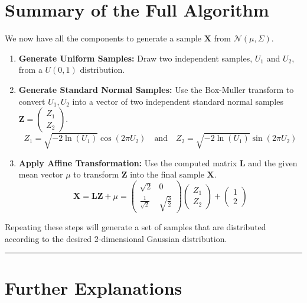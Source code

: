 \documentclass[11pt,a4paper]{article}
\newcommand{\N}{\mathcal{N}}
\newcommand{\mat}[1]{\mathbf{#1}}
\begin{document}
\section{Summary of the Full Algorithm}

We now have all the components to generate a sample $\mat{X}$ from $\N(\mu, \Sigma)$.

\begin{enumerate}
    \item \textbf{Generate Uniform Samples:} Draw two independent samples, $U_1$ and $U_2$, from a $U(0,1)$ distribution.

    \item \textbf{Generate Standard Normal Samples:} Use the Box-Muller transform to convert $U_1, U_2$ into a vector of two independent standard normal samples $\mat{Z} = \begin{pmatrix} Z_1 \\ Z_2 \end{pmatrix}$.
    \[
    Z_1 = \sqrt{-2 \ln(U_1)} \cos(2\pi U_2) \quad \text{and} \quad Z_2 = \sqrt{-2 \ln(U_1)} \sin(2\pi U_2)
    \]

    \item \textbf{Apply Affine Transformation:} Use the computed matrix $\mat{L}$ and the given mean vector $\mu$ to transform $\mat{Z}$ into the final sample $\mat{X}$.
    \[ \mat{X} = \mat{L}\mat{Z} + \mu = \begin{pmatrix} \sqrt{2} & 0 \\ \frac{1}{\sqrt{2}} & \sqrt{\frac{3}{2}} \end{pmatrix} \begin{pmatrix} Z_1 \\ Z_2 \end{pmatrix} + \begin{pmatrix} 1 \\ 2 \end{pmatrix} \]
\end{enumerate}
Repeating these steps will generate a set of samples that are distributed according to the desired 2-dimensional Gaussian distribution.

\hrule
\vspace{1cm}
\section*{Further Explanations}

\hypertarget{concept:its}{}%
\end{document}
